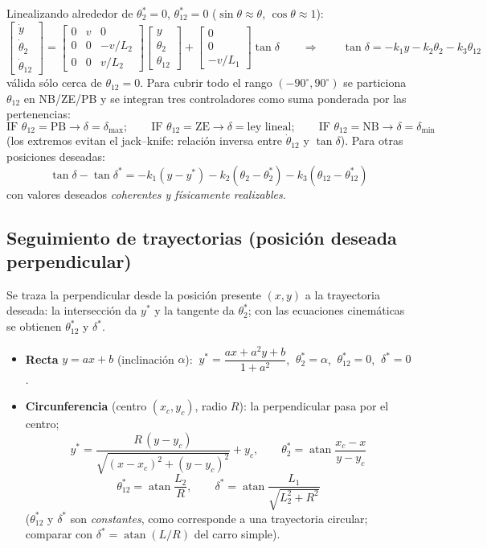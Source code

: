 \documentclass[11pt,a4paper]{article}
\newcommand{\grados}{^{\circ}}
\begin{document}
Linealizando alrededor de $\theta_2^{*}=0$, $\theta_{12}^{*}=0$ ($\sin\theta\approx\theta$, $\cos\theta\approx1$):
\[
\begin{bmatrix}\dot y\\\dot\theta_2\\\dot\theta_{12}\end{bmatrix}=
\begin{bmatrix}0&v&0\\0&0&-v/L_2\\0&0&v/L_2\end{bmatrix}
\begin{bmatrix}y\\\theta_2\\\theta_{12}\end{bmatrix}+
\begin{bmatrix}0\\0\\-v/L_1\end{bmatrix}\tan\delta
\qquad\Rightarrow\qquad
\tan\delta=-k_1y-k_2\theta_2-k_3\theta_{12}
\]
válida sólo cerca de $\theta_{12}=0$. Para cubrir todo el rango $(-90\grados,90\grados)$ se particiona $\theta_{12}$ en NB/ZE/PB y se integran tres controladores como suma ponderada por las pertenencias:
\[
\text{IF }\theta_{12}=\text{PB}\to\delta=\delta_{\max};\qquad
\text{IF }\theta_{12}=\text{ZE}\to\delta=\text{ley lineal};\qquad
\text{IF }\theta_{12}=\text{NB}\to\delta=\delta_{\min}
\]
(los extremos evitan el jack--knife: relación inversa entre $\dot\theta_{12}$ y $\tan\delta$). Para otras posiciones deseadas:
\[
\tan\delta-\tan\delta^{*}=-k_1(y-y^{*})-k_2(\theta_2-\theta_2^{*})-k_3(\theta_{12}-\theta_{12}^{*})
\]
con valores deseados \emph{coherentes y físicamente realizables}.

\subsection{Seguimiento de trayectorias (posición deseada perpendicular)}

Se traza la perpendicular desde la posición presente $(x,y)$ a la trayectoria deseada: la intersección da $y^{*}$ y la tangente da $\theta_2^{*}$; con las ecuaciones cinemáticas se obtienen $\theta_{12}^{*}$ y $\delta^{*}$.
\begin{itemize}[itemsep=1pt]
\item \textbf{Recta} $y=ax+b$ (inclinación $\alpha$): $\ y^{*}=\dfrac{ax+a^2y+b}{1+a^2}$, $\ \theta_2^{*}=\alpha$, $\ \theta_{12}^{*}=0$, $\ \delta^{*}=0$.
\item \textbf{Circunferencia} (centro $(x_c,y_c)$, radio $R$): la perpendicular pasa por el centro;
\[
y^{*}=\frac{R\,(y-y_c)}{\sqrt{(x-x_c)^2+(y-y_c)^2}}+y_c,\qquad
\theta_2^{*}=\operatorname{atan}\frac{x_c-x}{y-y_c}
\]
\[
\boxed{\theta_{12}^{*}=\operatorname{atan}\frac{L_2}{R}},\qquad
\boxed{\delta^{*}=\operatorname{atan}\frac{L_1}{\sqrt{L_2^2+R^2}}}
\]
($\theta_{12}^{*}$ y $\delta^{*}$ son \emph{constantes}, como corresponde a una trayectoria circular; comparar con $\delta^{*}=\operatorname{atan}(L/R)$ del carro simple).
\end{itemize}
\end{document}
